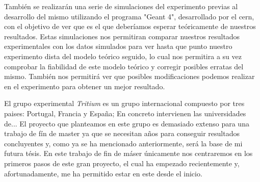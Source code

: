 También se realizarán una serie de simulaciones del experimento previas al desarrollo del mismo utilizando el programa "Geant 4", desarrollado por el cern, con el objetivo de ver que es el que deberíamos esperar teóricamente de nuestros resultados. Estas simulaciones nos permitiran comparar nuestros resultados experimentales con los datos simulados para ver hasta que punto nuestro experimento dista del modelo teórico seguido, lo cual nos permitira a su vez comprobar la fiabilidad de este modelo teórico y corregir posibles erratas del mismo. También nos permitirá ver que posibles modificaciones podemos realizar en el experimento para obtener un mejor resultado.

El grupo experimental \textit{Tritium} es un grupo internacional compuesto por tres paises: Portugal, Francia y España; En concreto intervienen las universidades de...  El proyecto que planteamos en este grupo es demasiado extenso para una trabajo de fín de master ya que se necesitan años para conseguir resultados concluyentes y, como ya se ha mencionado anteriormente, será la base de mi futura tésis. En este trabajo de fin de máser únicamente nos centraremos en los primeros pasos de este gran proyecto, el cual ha empezado recientemente y, afortunadamente, me ha permitido estar en este desde el inicio.

